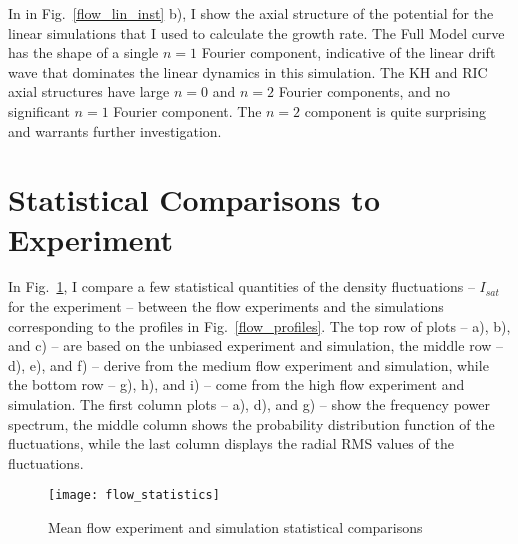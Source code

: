In in Fig.~\ref{flow_lin_inst} b), I show the axial structure of the potential for the linear simulations that I used to calculate the growth rate. The Full Model curve has the shape of 
a single $n=1$ Fourier component, indicative of the linear drift wave that dominates the linear dynamics in this simulation. The KH and RIC axial structures
have large $n=0$ and $n=2$ Fourier components, and no significant $n=1$ Fourier component. The $n=2$ component is quite surprising and warrants further investigation.

\section{Statistical Comparisons to Experiment}
\label{s_flow_stats}

In Fig.~\ref{flow_statistics}, I compare a few statistical quantities of the density fluctuations -- $I_{sat}$ for the experiment --
between the flow experiments and the simulations corresponding to the profiles in Fig.~\ref{flow_profiles}. The top row
of plots -- a), b), and c) -- are based on the unbiased experiment and simulation, the middle row --  d), e), and f) -- derive from the medium flow experiment and simulation, 
while the bottom row -- g), h), and i) -- come from the high flow experiment and simulation. The first column plots -- a), d), and g) -- 
show the frequency power spectrum, the middle column shows the probability distribution function of the fluctuations, while the last column displays the radial RMS values of the fluctuations.

\begin{figure}
\centerline{\texttt{[image: flow\_statistics]}}
\caption{Mean flow experiment and simulation statistical comparisons}
\label{flow_statistics}
\end{figure}

